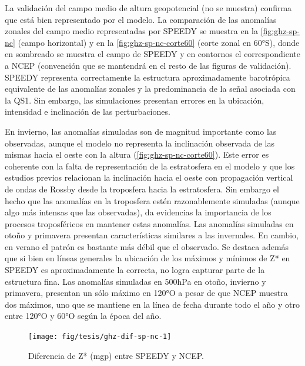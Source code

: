 \documentclass[spanish,a4paper,12pt,oneside]{book}
\begin{document}
La validación del campo medio de altura geopotencial (no se muestra)
confirma que está bien representado por el modelo. La comparación de las
anomalías zonales del campo medio representadas por SPEEDY se muestra en
la \autoref{fig:ghz-sp-nc} (campo horizontal) y en la
\autoref{fig:ghz-sp-nc-corte60} (corte zonal en 60°S), donde en
sombreado se muestra el campo de SPEEDY y en contornos el
correspondiente a NCEP (convención que se mantendrá en el resto de las
figuras de validación). SPEEDY representa correctamente la estructura
aproximadamente barotrópica equivalente de las anomalías zonales y la
predominancia de la señal asociada con la QS1. Sin embargo, las
simulaciones presentan errores en la ubicación, intensidad e inclinación
de las perturbaciones.

En invierno, las anomalías simuladas son de magnitud importante como las
observadas, aunque el modelo no representa la inclinación observada de
las mismas hacia el oeste con la altura
(\autoref{fig:ghz-sp-nc-corte60}). Este error es coherente con la falta
de representación de la estratosfera en el modelo y que los estudios
previos relacionan la inclinación hacia el oeste con propagación
vertical de ondas de Rossby desde la troposfera hacia la estratosfera.
Sin embargo el hecho que las anomalías en la troposfera estén
razonablemente simuladas (aunque algo más intensas que las observadas),
da evidencias la importancia de los procesos troposféricos en mantener
estas anomalías. Las anomalías simuladas en otoño y primavera presentan
características similares a las invernales. En cambio, en verano el
patrón es bastante más débil que el observado. Se destaca además que si
bien en líneas generales la ubicación de los máximos y mínimos de Z* en
SPEEDY es aproximadamente la correcta, no logra capturar parte de la
estructura fina. Las anomalías simuladas en 500hPa en otoño, invierno y
primavera, presentan un sólo máximo en 120°O a pesar de que NCEP muestra
dos máximos, uno que se mantiene en la línea de fecha durante todo el
año y otro entre 120°O y 60°O según la época del año.

\begin{landscape}\begin{figure}

{\centering \texttt{[image: fig/tesis/ghz-dif-sp-nc-1]} 

}

\caption{Diferencia de Z* (mgp) entre SPEEDY y NCEP.}\label{fig:ghz-dif-sp-nc}
\end{figure}
\end{landscape}
\end{document}

